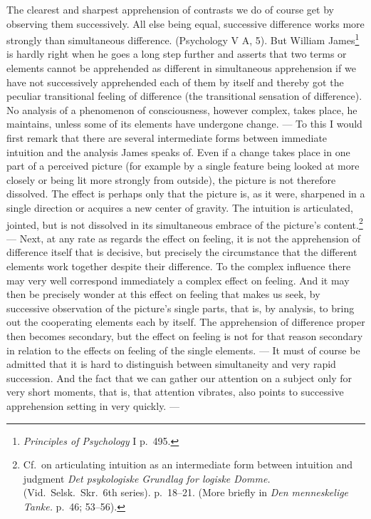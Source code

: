 \documentclass[12pt]{book}
\newcommand{\opage}[1]{\marginnote{\footnotesize\textit{[#1]}}}
\begin{document}
The clearest and sharpest apprehension of contrasts we do of course get by
observing them successively. All else being equal, successive difference works
more strongly than simultaneous difference. (Psychology V A, 5). But William
James\footnote{\textit{Principles of Psychology} I p.~495.} is hardly right when
he goes a long step further and asserts that two terms or elements cannot be
apprehended as different in simultaneous apprehension if we have not
successively apprehended each of them by itself and thereby got the peculiar
transitional feeling of difference (the transitional sensation of difference).
No analysis of a phenomenon of consciousness, however complex, takes place, he
maintains, unless some of its elements have undergone change. --- To this I would
first remark that there are several intermediate forms between immediate
intuition and the analysis James speaks of. Even if a change takes place in one
part of a perceived picture (for example by a single feature being looked at more
closely or being lit more strongly from outside), the picture is not therefore
dissolved. The effect is perhaps only that the picture is, as it were, sharpened
in a single direction or acquires a new center of gravity. The intuition is
articulated, jointed, but is not dissolved in its simultaneous embrace of the
picture's content.\footnote{Cf.\ on articulating intuition as an intermediate
form between intuition and judgment \textit{Det psykologiske Grundlag for logiske
Domme.} (Vid.\ Selsk.\ Skr.\ 6th series). p.~18--21. (More briefly in \textit{Den
menneskelige Tanke.} p.~46; 53--56).} --- Next, at any rate as regards the effect
on feeling, it is not the apprehension of difference itself that is decisive, but
precisely the \opage{29}circumstance that the different elements work together
despite their difference. To the complex influence there may very well correspond
immediately a complex effect on feeling. And it may then be precisely wonder at
this effect on feeling that makes us seek, by successive observation of the
picture's single parts, that is, by analysis, to bring out the cooperating
elements each by itself. The apprehension of difference proper then becomes
secondary, but the effect on feeling is not for that reason secondary in relation
to the effects on feeling of the single elements. --- It must of course be
admitted that it is hard to distinguish between simultaneity and very rapid
succession. And the fact that we can gather our attention on a subject only for
very short moments, that is, that attention vibrates, also points to successive
apprehension setting in very quickly. ---
\end{document}
